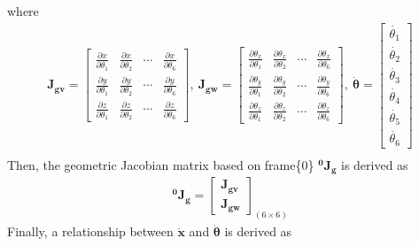 where
\begin{equation*}
\begin{split}
\mathbf{J_{gv}} =
\begin{bmatrix}
\frac{\partial x}{\partial \theta _1}	&\frac{\partial x}{\partial \theta _2}	&\cdots		&\frac{\partial x}{\partial \theta _6}\\
\frac{\partial y}{\partial \theta _1}	&\frac{\partial y}{\partial \theta _2}	&\cdots		&\frac{\partial y}{\partial \theta _6}\\
\frac{\partial z}{\partial \theta _1}	&\frac{\partial z}{\partial \theta _2}	&\cdots		&\frac{\partial z}{\partial \theta _6}
\end{bmatrix}
,\ \mathbf{J_{gw}} = 
\begin{bmatrix}
\frac{\partial \theta _x}{\partial \theta _1}	&\frac{\partial \theta _x}{\partial \theta _2}	&\cdots		&\frac{\partial \theta _x}{\partial \theta _6}\\
\frac{\partial \theta _y}{\partial \theta _1}	&\frac{\partial \theta _y}{\partial \theta _2}	&\cdots		&\frac{\partial \theta _y}{\partial \theta _6}\\
\frac{\partial \theta _z}{\partial \theta _1}	&\frac{\partial \theta _z}{\partial \theta _2}	&\cdots		&\frac{\partial \theta _z}{\partial \theta _6}
\end{bmatrix} 
,\ \boldsymbol{\dot{\theta}}
=
\begin{bmatrix}
\dot{\theta _1} \\ 
\dot{\theta _2} \\ 
\dot{\theta _3} \\ 
\dot{\theta _4} \\ 
\dot{\theta _5} \\ 
\dot{\theta _6} 
\end{bmatrix}\\
\end{split}
\end{equation*}
Then, the geometric Jacobian matrix based on frame\{0\} $\mathbf{^0J_g}$ is derived as
\begin{equation}
\begin{split}
\mathbf{^0J_g}
=
\begin{bmatrix}
\mathbf{J_{gv}}\\
\mathbf{J_{gw}}
\end{bmatrix}_{(6 \times 6)}
\end{split}
\end{equation}
Finally, a relationship between $\boldsymbol{\dot{x}}$ and $\boldsymbol{\dot{\theta}}$ is derived as 
